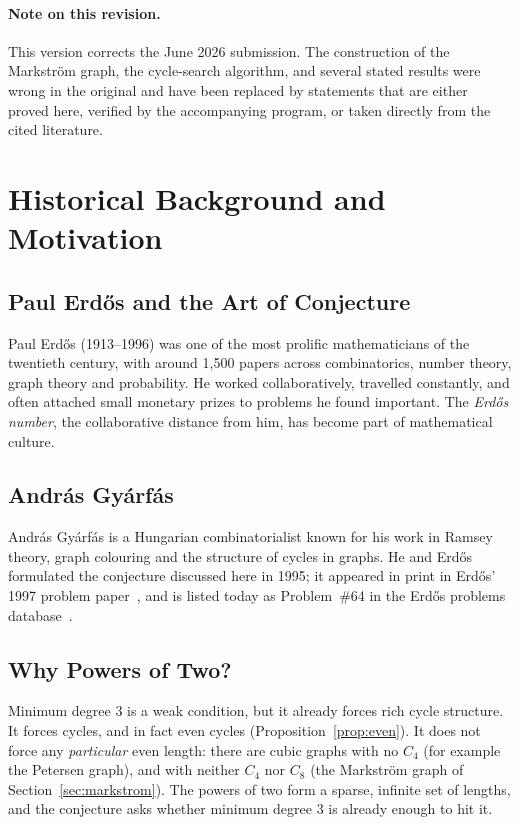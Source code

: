\documentclass[11pt,a4paper]{article}
\theoremstyle{definition}
\newcommand{\C}[1]{C_{#1}}
\begin{document}
\paragraph{Note on this revision.}
This version corrects the June 2026 submission. The construction of the
Markstr\"om graph, the cycle-search algorithm, and several stated results were
wrong in the original and have been replaced by statements that are either
proved here, verified by the accompanying program, or taken directly from the
cited literature.

\section{Historical Background and Motivation}

\subsection{Paul Erd\H{o}s and the Art of Conjecture}

Paul Erd\H{o}s (1913--1996) was one of the most prolific mathematicians of the
twentieth century, with around 1{,}500 papers across combinatorics, number
theory, graph theory and probability. He worked collaboratively, travelled
constantly, and often attached small monetary prizes to problems he found
important. The \emph{Erd\H{o}s number}, the collaborative distance from him,
has become part of mathematical culture.

\subsection{Andr\'as Gy\'arf\'as}

Andr\'as Gy\'arf\'as is a Hungarian combinatorialist known for his work in
Ramsey theory, graph colouring and the structure of cycles in graphs. He and
Erd\H{o}s formulated the conjecture discussed here in 1995; it appeared in
print in Erd\H{o}s' 1997 problem paper~\cite{erdos1997}, and is listed today as
Problem~\#64 in the Erd\H{o}s problems database~\cite{erdosproblems}.

\subsection{Why Powers of Two?}

Minimum degree $3$ is a weak condition, but it already forces rich cycle
structure. It forces cycles, and in fact even cycles (Proposition~\ref{prop:even}).
It does not force any \emph{particular} even length: there are cubic graphs
with no $\C4$ (for example the Petersen graph), and with neither $\C4$ nor
$\C8$ (the Markstr\"om graph of Section~\ref{sec:markstrom}). The powers of
two form a sparse, infinite set of lengths, and the conjecture asks whether
minimum degree $3$ is already enough to hit it.
\end{document}
